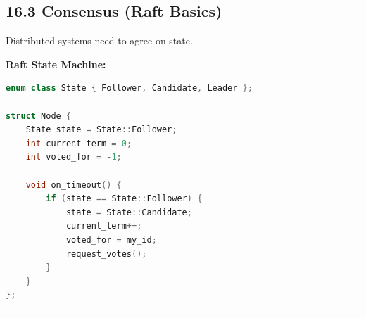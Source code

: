 \hypertarget{consensus-raft-basics}{%
\subsection{16.3 Consensus (Raft Basics)}\label{consensus-raft-basics}}

Distributed systems need to agree on state.

\textbf{Raft State Machine:}

\begin{lstlisting}[language={C++}]
enum class State { Follower, Candidate, Leader };

struct Node {
    State state = State::Follower;
    int current_term = 0;
    int voted_for = -1;
    
    void on_timeout() {
        if (state == State::Follower) {
            state = State::Candidate;
            current_term++;
            voted_for = my_id;
            request_votes();
        }
    }
};
\end{lstlisting}

\begin{center}\rule{0.5\linewidth}{0.5pt}\end{center}

